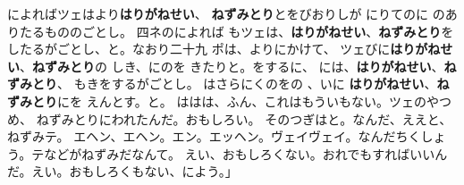 \documentclass[
a4paper,
10pt,
book]
{tarticle}
\begin{document}
\newpage
\thispagestyle{fancy}
\fancyhead[R]{\empty}
によればツェはより\textbf{はりがねせい}、
\textbf{ねずみとり}とをびおりしが
にりてのに
のありたるもののごとし。
四ネのによれば
もツェは、\textbf{はりがねせい}、\textbf{ねずみとり}を
したるがごとし、と。なおり二十九
ポは、よりにかけて、
ツェびに\textbf{はりがねせい}、\textbf{ねずみとり}の
しき、にのを
きたりと。をするに、
には、\textbf{はりがねせい}、\textbf{ねずみとり}、
もきをするがごとし。
はさらにくのをの
、いに
\textbf{はりがねせい}、\textbf{ねずみとり}にを
えんとす。と。
ははは、ふん、これはもういもない。ツェのやつめ、
ねずみとりにわれたんだ。おもしろい。
そのつぎはと。なんだ、ええと、ねずみテ。
エヘン、エヘン。エン。エッヘン。ヴェイヴェイ。なんだちくしょう。テなどがねずみだなんて。
えい、おもしろくない。おれでもすればいいんだ。えい。おもしろくもない、によう。」
\begin{comment}
\end{comment}
\end{document}

